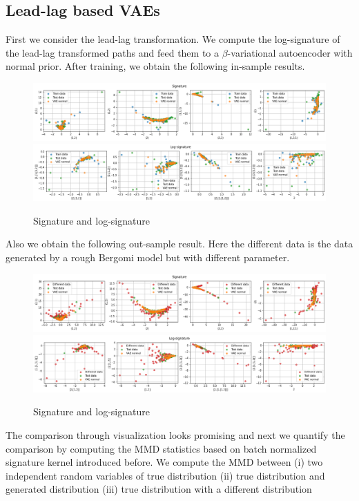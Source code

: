 \documentclass[12pt]{report}
\theoremstyle{definition}
\theoremstyle{remark}
\begin{document}
\subsection{Lead-lag based VAEs}
First we consider the lead-lag transformation. We compute the log-signature of the lead-lag transformed paths and feed them to a $\beta$-variational autoencoder with normal prior. After training, we obtain the following in-sample results.
 \begin{figure}[H]
    \centering
    \includegraphics[width=\textwidth]{figs/cvae6.png}
    \includegraphics[width=\textwidth]{figs/cvae7.png}
    \caption{Signature and log-signature}
\end{figure}
Also we obtain the following out-sample result. Here the different data is the data generated by a rough Bergomi model but with different parameter.
 \begin{figure}[H]
    \centering
    \includegraphics[width=\textwidth]{figs/cvae8.png}
    \includegraphics[width=\textwidth]{figs/cvae9.png}
    \caption{Signature and log-signature}
\end{figure}
The comparison through visualization looks promising and next we quantify the comparison by computing the MMD statistics based on batch normalized signature kernel introduced before. We compute the MMD between (i) two independent random variables of true distribution (ii) true distribution and generated distribution (iii) true distribution with a different distribution 
\end{document}
